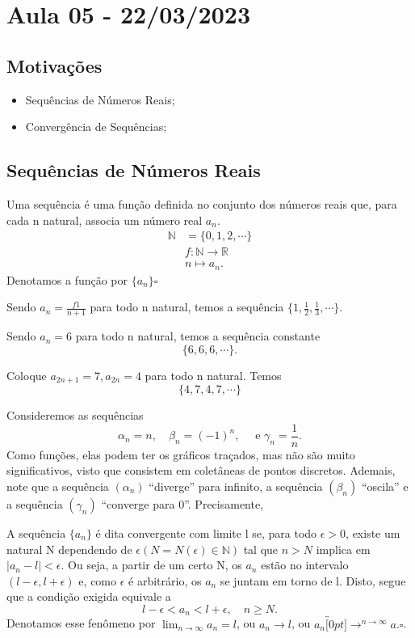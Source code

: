 \documentclass[analysis_notes.tex]{subfiles}
\begin{document}
\section{Aula 05 - 22/03/2023}
\subsection{Motiva\c c\~oes}
\begin{itemize}
	\item Sequ\^encias de N\'umeros Reais;
	\item Converg\^encia de Sequ\^encias;
\end{itemize}
\subsection{Sequ\^encias de N\'umeros Reais}
\begin{def*}
	Uma sequ\^encia \'e uma fun\c c\~ao definida no conjunto dos n\'umeros reais que, para cada n natural, associa um n\'umero real $a_{n}$.
	\begin{align*}
		\mathbb{N} & =\{0, 1, 2, \cdots\}               \\
		           & f:\mathbb{N}\rightarrow \mathbb{R} \\
		           & n\mapsto a_{n}.
	\end{align*}
	Denotamos a fun\c c\~ao por $\{a_{n}\}\square$
\end{def*}
\begin{example}
	Sendo $a_{n}=\frac{f1}{n+1}$ para todo n natural, temos a sequ\^encia $\{1, \frac{1}{2}, \frac{1}{3}, \cdots\}$.
\end{example}
\begin{example}
	Sendo $a_{n} = 6$ para todo n natural, temos a sequ\^encia constante
	$$
		\{6, 6, 6,\cdots\}.
	$$
\end{example}
\begin{example}
	Coloque $a_{2n+1} = 7, a_{2n}=4$ para todo n natural. Temos
	$$
		\{4, 7, 4, 7, \cdots\}
	$$
\end{example}
Consideremos as sequ\^encias
$$
	\alpha_{n} = n, \quad \beta_{n} = (-1)^{n},\quad \text{ e } \gamma_{n} = \frac{1}{n}.
$$
Como fun\c c\~oes, elas podem ter os gr\'aficos tra\c cados, mas n\~ao s\~ao muito significativos, visto que consistem em
colet\^aneas de pontos discretos. Ademais, note que a sequ\^encia $(\alpha_{n})$ ``diverge'' para infinito, a sequ\^encia
$(\beta_{n})$ ``oscila'' e a sequ\^encia $(\gamma_{n})$ ``converge para 0''. Precisamente,
\begin{def*}
	A sequ\^encia $\{a_{n}\}$ \'e dita convergente com limite l se, para todo $\epsilon > 0$, existe um natural
	N dependendo de $\epsilon (N = N(\epsilon)\in \mathbb{N})$ tal que $n > N$ implica em $|a_{n} - l|< \epsilon.$
	Ou seja, a partir de um certo N, os $a_{n}$ est\~ao no intervalo $(l-\epsilon, l+\epsilon)$ e, como $\epsilon$
	\'e arbitr\'ario, os $a_{n}$ se juntam em torno de l. Disto, segue que a condi\c c\~ao exigida equivale a
	$$
		l - \epsilon < a_{n} < l + \epsilon, \quad n\geq{N}.
	$$
	Denotamos esse fen\^omeno por $\displaystyle\lim_{n\to\infty}a_{n} = l$, ou $a_{n}\rightarrow l$, ou $a_{n}\overbracket[0pt]{\longrightarrow}^{n\to \infty}a.\square$.
\end{def*}
\end{document}
